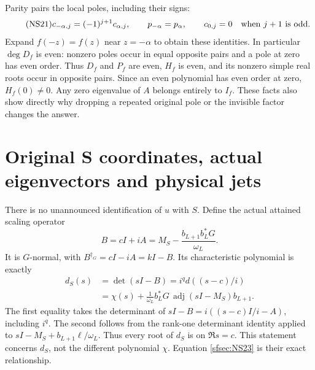 \documentclass[11pt]{article}
\begin{document}
Parity pairs the local poles, including their signs:
\begin{equation}\tag{NS21}\label{sfsec:NS21}
c_{-\alpha,j}=(-1)^{j+1}c_{\alpha,j},\qquad
p_{-\alpha}=p_\alpha,\qquad
c_{0,j}=0\quad\hbox{when }j+1\hbox{ is odd}.
\end{equation}
Expand $f(-z)=f(z)$ near $z=-\alpha$ to obtain these
identities. In particular $\deg D_f$ is even: nonzero
poles occur in equal opposite pairs and a pole at zero
has even order. Thus $D_f$ and $P_f$ are even, $H_f$
is even, and its nonzero simple real roots occur in
opposite pairs. Since an even polynomial has even
order at zero, $H_f(0)\ne0$. Any zero eigenvalue of
$A$ belongs entirely to $I_f$. These facts also show
directly why dropping a repeated original pole or the
invisible factor changes the answer.

\section{Original S coordinates, actual eigenvectors and physical jets}

There is no unannounced identification of $u$ with $S$.
Define the actual attained scaling operator
\begin{equation}\tag{NS22}\label{sfsec:NS22}
B=cI+iA=M_S-\frac{b_{L+1}b_L^*G}{\omega_L}.
\end{equation}
It is $G$-normal, with $B^{\dagger_G}=cI-iA=kI-B$.
Its characteristic polynomial is exactly
\begin{equation}\tag{NS23}\label{sfsec:NS23}
\begin{split}
d_S(s)&=\det(sI-B)=i^qd((s-c)/i)\\
 &=\chi(s)
  +\frac1{\omega_L}b_L^*G\,
               \operatorname{adj}(sI-M_S)b_{L+1}.
\end{split}
\end{equation}
The first equality takes the determinant of
$sI-B=i((s-c)I/i-A)$, including $i^q$.
The second follows from the rank-one determinant identity
applied to $sI-M_S+b_{L+1}\ell/\omega_L$.
Thus every root of $d_S$ is on $\Re s=c$.
This statement concerns $d_S$, not the different polynomial
$\chi$. Equation \eqref{sfsec:NS23} is their exact relationship.
\end{document}
